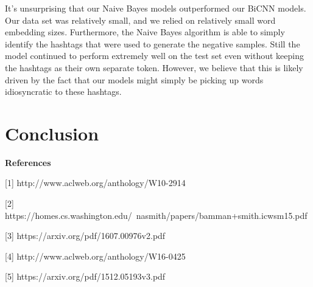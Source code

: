 \documentclass[11pt,a4paper]{article}
\begin{document}
It's unsurprising that our Naive Bayes models outperformed our BiCNN models. Our data set was relatively small, and we relied on relatively small word embedding sizes. Furthermore, the Naive Bayes algorithm is able to simply identify the hashtags that were used to generate the negative samples. Still the model continued to perform extremely well on the test set even without keeping the hashtags as their own separate token. However, we believe that this is likely driven by the fact that our models might simply be picking up words idiosyncratic to these hashtags.


\section{Conclusion}



\textbf{References}

[1] http://www.aclweb.org/anthology/W10-2914

[2] https://homes.cs.washington.edu/~nasmith/papers/bamman+smith.icwsm15.pdf

[3] https://arxiv.org/pdf/1607.00976v2.pdf

[4] http://www.aclweb.org/anthology/W16-0425

[5] https://arxiv.org/pdf/1512.05193v3.pdf
\end{document}
